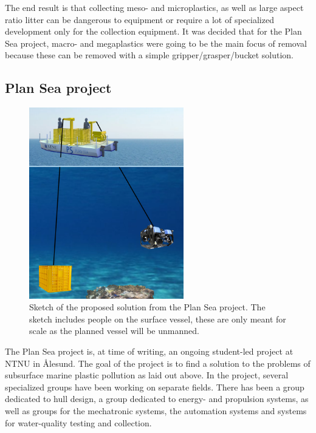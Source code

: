 \documentclass[class=article, crop=false]{standalone}
\begin{document}
The end result is that collecting meso- and microplastics, as well as large aspect ratio litter can be dangerous to equipment or require a lot of specialized development only for the collection equipment. It was decided that for the Plan Sea project, macro- and megaplastics were going to be the main focus of removal because these can be removed with a simple gripper/grasper/bucket solution.

\subsection{Plan Sea project}
\begin{figure}
	\centering
	\includegraphics[width=0.6\textwidth]{overview}
	\caption{Sketch of the proposed solution from the Plan Sea project. The sketch includes people on the surface vessel, these are only meant for scale as the planned vessel will be unmanned.}
	\label{fig:overview-sketch}
\end{figure}
The Plan Sea project is, at time of writing, an ongoing student-led project at NTNU in Ålesund. The goal of the project is to find a solution to the problems of subsurface marine plastic pollution as laid out above. In the project, several specialized groups have been working on separate fields. There has been a group dedicated to hull design, a group dedicated to energy- and propulsion systems, as well as groups for the mechatronic systems, the automation systems and systems for water-quality testing and collection.
\end{document}
